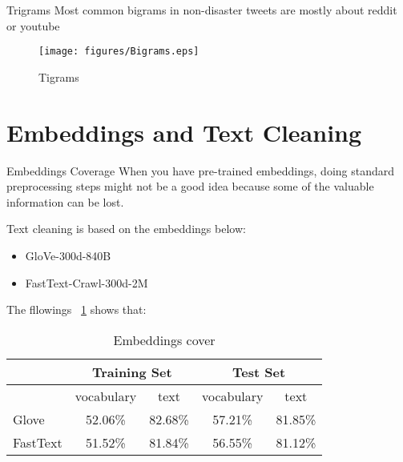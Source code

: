 \documentclass[
 size=12pt,
 paper=smartboard, %
 mode=present, %
 display=slides, %
 style=tuliplab,  %
 pauseslide,
 fleqn,leqno,clock]{powerdot}
\begin{document}
\begin{slide}{Trigrams}
	Most common bigrams in non-disaster tweets are mostly about reddit or youtube
	\begin{figure}[htbp]
		\centering
		\texttt{[image: figures/Bigrams.eps]}
		\caption{Tigrams}
	\end{figure}
\end{slide}

\section{Embeddings and Text Cleaning}
\begin{slide}{Embeddings Coverage}
When you have pre-trained embeddings, doing standard preprocessing 
steps  might not be a good idea because some of the valuable 
information can be lost.

Text cleaning is based on the embeddings below:

\begin{itemize}
	\item GloVe-300d-840B
	\item FastText-Crawl-300d-2M 
\end{itemize}
The fllowings ~\cref{tab:Embeddings-cover} shows that:

\begin{table}[htbp]
	\centering
	\caption{Embeddings cover}
	\begin{tabular}{lcccc}
		\toprule
		& \multicolumn{2}{c}{Training Set} & \multicolumn{2}{c}{Test Set} \\
		\midrule
		& vocabulary & text  & vocabulary & text \\
		\midrule
		Glove & 52.06\% & 82.68\% & 57.21\% & 81.85\% \\
		FastText & 51.52\% & 81.84\% & 56.55\% & 81.12\% \\
		\bottomrule
	\end{tabular}%
	\label{tab:Embeddings-cover}%
\end{table}%
\end{slide}
\end{document}
